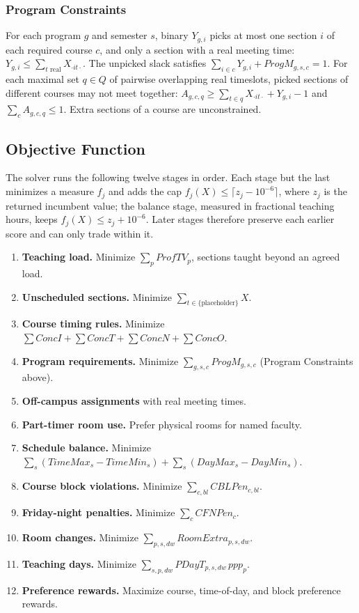 \documentclass[11pt, oneside]{article}   	%
\begin{document}
\subsubsection{Program Constraints}
For each program $g$ and semester $s$, binary $Y_{g,i}$ picks at most one section
$i$ of each required course $c$, and only a section with a real meeting time:
$Y_{g,i}\le\sum_{t\text{ real}}X_{\cdot i t\cdot}$. The unpicked slack satisfies
$\sum_{i\in c}Y_{g,i}+ProgM_{g,s,c}=1$. For each maximal set $q\in Q$ of pairwise
overlapping real timeslots, picked sections of different courses may not meet
together: $A_{g,c,q}\ge\sum_{t\in q}X_{\cdot i t\cdot}+Y_{g,i}-1$ and
$\sum_c A_{g,c,q}\le 1$. Extra sections of a course are unconstrained.

\subsection{Objective Function}
The solver runs the following twelve stages in order. Each stage but the last
minimizes a measure $f_j$ and adds the cap $f_j(X)\le\lceil z_j-10^{-6}\rceil$,
where $z_j$ is the returned incumbent value; the balance stage, measured in
fractional teaching hours, keeps $f_j(X)\le z_j+10^{-6}$. Later stages therefore
preserve each earlier score and can only trade within it.
\begin{enumerate}
	\item \textbf{Teaching load.} Minimize $\sum_p ProfTV_p$, sections taught
		beyond an agreed load.
	\item \textbf{Unscheduled sections.} Minimize
		$\sum_{t\in\{\text{placeholder}\}}X$.
	\item \textbf{Course timing rules.} Minimize
		$\sum ConcI+\sum ConcT+\sum ConcN+\sum ConcO$.
	\item \textbf{Program requirements.} Minimize $\sum_{g,s,c} ProgM_{g,s,c}$
		(Program Constraints above).
	\item \textbf{Off-campus assignments} with real meeting times.
	\item \textbf{Part-timer room use.} Prefer physical rooms for named faculty.
	\item \textbf{Schedule balance.} Minimize
		$\sum_s (TimeMax_s-TimeMin_s)+\sum_s (DayMax_s-DayMin_s)$.
	\item \textbf{Course block violations.} Minimize $\sum_{c,bl}CBLPen_{c,bl}$.
	\item \textbf{Friday-night penalties.} Minimize $\sum_c CFNPen_c$.
	\item \textbf{Room changes.} Minimize $\sum_{p,s,dw}RoomExtra_{p,s,dw}$.
	\item \textbf{Teaching days.} Minimize $\sum_{s,p,dw}PDayT_{p,s,dw}\,ppp_p$.
	\item \textbf{Preference rewards.} Maximize course, time-of-day, and block
		preference rewards.
\end{enumerate}
\end{document}
